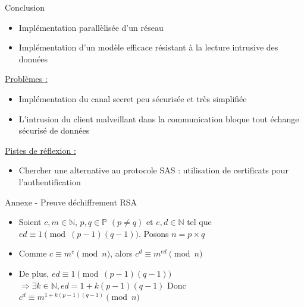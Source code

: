 \documentclass{beamer}
\begin{document}
\begin{frame}{Conclusion}
    \begin{itemize}
        \item Implémentation parallèlisée d'un réseau
        \item Implémentation d'un modèle efficace résistant à la lecture intrusive des données
    \end{itemize}
    \underline{Problèmes :}
    \begin{itemize}
        \item Implémentation du canal secret peu sécurisée et très simplifiée
        \item L'intrusion du client malveillant dans la communication bloque tout échange sécurisé de données
    \end{itemize}
    \underline{Pistes de réflexion :}
    \begin{itemize}
        \item Chercher une alternative au protocole SAS : utilisation de certificats pour l'authentification
    \end{itemize}
\end{frame}

\begin{frame}{Annexe - Preuve déchiffrement RSA}
    \begin{itemize}
        \item Soient $c, m \in \mathbb{N}$, $p, q \in \mathbb{P}$ $(p \neq q)$ et $e,d \in \mathbb{N}$ tel que \newline $ed \equiv 1 \pmod{(p-1)(q-1)}$. Posons $n = p\times q$
        \item Comme $c \equiv m^e \pmod{n}$, alors
        $c^d \equiv m^{ed} \pmod{n}$
        \item De plus, $ed \equiv 1 \pmod{(p-1)(q-1)}$ \newline
        $\Rightarrow \exists k \in \mathbb{N}, ed = 1 + k(p-1)(q-1)$ \newline
        Donc  $c^d \equiv m^{1 + k(p-1)(q-1)} \pmod{n}$
    \end{itemize}
\end{frame}
\end{document}

